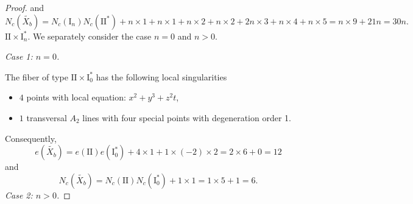 \documentclass[a4paper]{amsart}
\theoremstyle{plain}
\theoremstyle{definition}
\theoremstyle{remark}
\numberwithin{equation}{section}
\begin{document}
\begin{proof}
and
\[
N_{c}(\widetilde{X_{b}}) = N_{c}(\mathrm{I}_{n})N_{c}(\mathrm{II}^{*}) + n\times1 + n\times1 + n \times 2+ n \times 2 +  2n \times 3 + n\times 4 + n\times 5 = n\times 9 + 21n = 30n.
\]
\medskip
\noindent\emph{$\mathrm{II} \times \mathrm{I}_{n}^{*}$}.
We separately consider the case $n=0$ and $n>0$.

\medskip
\noindent
\emph{Case 1: $n=0$.}

The fiber of type $\mathrm{II} \times \mathrm{I}_{0}^{*}$ has the following local singularities
\begin{itemize}
	\item [] $4$ points with local equation: $x^{2}+y^{3}+z^{2}t$,
	\item [] $1$ transversal $A_{2}$ lines with four  special points with degeneration order 1.
\end{itemize}
Consequently,
\[
e(\widetilde{X_{b}}) = e(\mathrm{II})e(\mathrm{I}_{0}^{*}) + 4\times1 + 1\times(-2)\times 2 = 2\times 6 + 0 = 12
\]
and
\[
N_{c}(\widetilde{X_{b}}) = N_{c}(\mathrm{II})N_{c}(\mathrm{I}_{0}^{*}) +1\times 1  = 1\times 5 + 1  = 6.
\]
\medskip
\noindent
\emph{Case 2: $n>0$.}


\end{proof}
\end{document}
